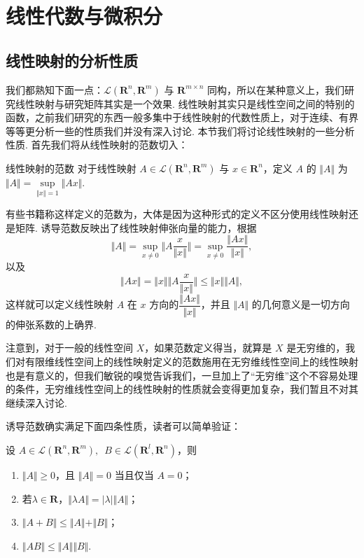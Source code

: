\chapter{线性代数与微积分}

\section{线性映射的分析性质}


我们都熟知下面一点：$\mathcal{L}(\mathbf{R}^n, \mathbf{R}^m)$ 与 $\mathbf{R}^{m\times n}$ 同构，所以在某种意义上，我们研究线性映射与研究矩阵其实是一个效果. 线性映射其实只是线性空间之间的特别的函数，之前我们研究的东西一般多集中于线性映射的代数性质上，对于连续、有界等等更分析一些的性质我们并没有深入讨论. 本节我们将讨论线性映射的一些分析性质. 首先我们将从线性映射的范数切入：

\begin{definition}{线性映射的范数}{} 
    对于线性映射 $A\in \mathcal{L}(\mathbf{R}^n, \mathbf{R}^m)$ 与 $x\in\mathbf{R}^n$，定义 $A$ 的 $\Vert A \Vert$ 为 $\Vert A \Vert = \sup\limits_{\Vert x\Vert =  1} \Vert Ax\Vert$.
\end{definition}

有些书籍称这样定义的范数为，大体是因为这种形式的定义不区分使用线性映射还是矩阵. 诱导范数反映出了线性映射伸张向量的能力，根据\[\Vert A\Vert = \sup\limits_{x\neq 0}\Vert A\frac{x}{\Vert x\Vert}\Vert = \sup\limits_{x\neq 0}\frac{\Vert Ax\Vert}{\Vert x\Vert},\]以及\[\Vert Ax\Vert = \Vert x\Vert \Vert A\frac{x}{\Vert x\Vert}\Vert \leqslant \Vert x\Vert \Vert A\Vert,\]这样就可以定义线性映射 $A$ 在 $x$ 方向的$\dfrac{\Vert Ax\Vert}{\Vert x\Vert}$，并且 $\Vert A\Vert$ 的几何意义是一切方向的伸张系数的上确界.

注意到，对于一般的线性空间 $X$，如果范数定义得当，就算是 $X$ 是无穷维的，我们对有限维线性空间上的线性映射定义的范数施用在无穷维线性空间上的线性映射也是有意义的，但我们敏锐的嗅觉告诉我们，一旦加上了“无穷维”这个不容易处理的条件，无穷维线性空间上的线性映射的性质就会变得更加复杂，我们暂且不对其继续深入讨论.

诱导范数确实满足下面四条性质，读者可以简单验证：

\begin{theorem}{}{}
    设 $A\in \mathcal{L}(\mathbf{R}^n, \mathbf{R}^m),\enspace B\in \mathcal{L}(\mathbf{R}^l, \mathbf{R}^n)$，则
    \begin{enumerate}
        \item $\Vert A\Vert\geqslant 0$，且 $\Vert A\Vert=0$ 当且仅当 $A=0$；
        \item 若$\lambda\in \mathbf{R}$，$\Vert \lambda A\Vert = \vert\lambda\vert \Vert A\Vert$；
        \item $\Vert A+B\Vert\leqslant\Vert A\Vert+\Vert B\Vert$；
        \item $\Vert AB\Vert\leqslant\Vert A\Vert\Vert B\Vert$.
    \end{enumerate}
\end{theorem}

